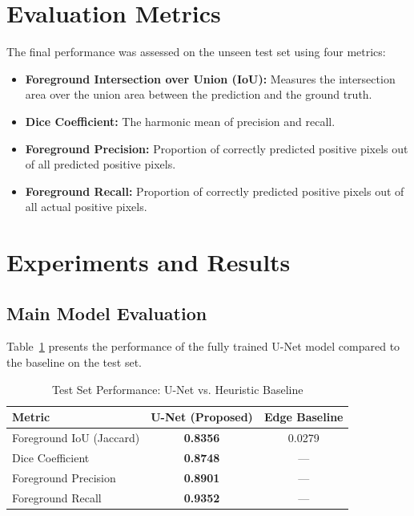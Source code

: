 \documentclass[11pt,a4paper]{article}
\begin{document}
\section{Evaluation Metrics}
The final performance was assessed on the unseen test set using four metrics:
\begin{itemize}
    \item \textbf{Foreground Intersection over Union (IoU):} Measures the intersection area over the union area between the prediction and the ground truth.
    \item \textbf{Dice Coefficient:} The harmonic mean of precision and recall.
    \item \textbf{Foreground Precision:} Proportion of correctly predicted positive pixels out of all predicted positive pixels.
    \item \textbf{Foreground Recall:} Proportion of correctly predicted positive pixels out of all actual positive pixels.
\end{itemize}

\section{Experiments and Results}

\subsection{Main Model Evaluation}
Table~\ref{tab:main_metrics} presents the performance of the fully trained U-Net model compared to the baseline on the test set.

\begin{table}[H]
    \centering
    \caption{Test Set Performance: U-Net vs. Heuristic Baseline}
    \begin{tabular}{lcc}
        \toprule
        \textbf{Metric} & \textbf{U-Net (Proposed)} & \textbf{Edge Baseline} \\
        \midrule
        Foreground IoU (Jaccard) & \textbf{0.8356} & 0.0279 \\
        Dice Coefficient & \textbf{0.8748} & --- \\
        Foreground Precision & \textbf{0.8901} & --- \\
        Foreground Recall & \textbf{0.9352} & --- \\
        \bottomrule
    \end{tabular}
    \label{tab:main_metrics}
\end{table}
\end{document}
